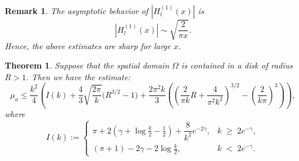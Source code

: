 \documentclass[12pt,reqno]{amsart}
\newtheorem{thm}{Theorem}[section]
\newtheorem{remark}{Remark}
\begin{document}
\begin{remark}
    The asymptotic behavior of $|H^{(1)}_{l}(x)|$ is 
    \[
    |H_l^{(1)}(x)| \sim \sqrt{\frac{2}{\pi x}}.
    \]
    Hence, the above estimates are sharp for large $x$.
\end{remark}
\begin{thm}
    Suppose that the spatial domain $\Omega$ is contained in a disk of radius $R>1$. Then we have the estimate:
$$
\mu_a\leq\frac{k^2}{4}\left(I(k)
    +\frac{4}{3} \sqrt{\frac{2 \pi}{k}}\big(R^{3 / 2}-1\big)+\frac{2\pi^2 k}{3}\left(\left(\frac{2}{\pi k} R+\frac{4}{\pi^2 k^2}\right)^{3 / 2}-\left(\frac{2}{k\pi}\right)^{3 }\right)\right) ,
$$
where 
\[
I(k) :=
\begin{cases}
\pi + 2\left(\gamma+\log\frac{k}{2}-\tfrac{1}{2}\right) + \dfrac{8}{k^2}e^{-2\gamma}, & k \;\geq\; 2e^{-\gamma}, \\[1.2em]
(\pi+1) - 2\gamma - 2\log\frac{k}{2}, & k \;<\; 2e^{-\gamma}.
\end{cases}
\]
\end{thm}
\end{document}
